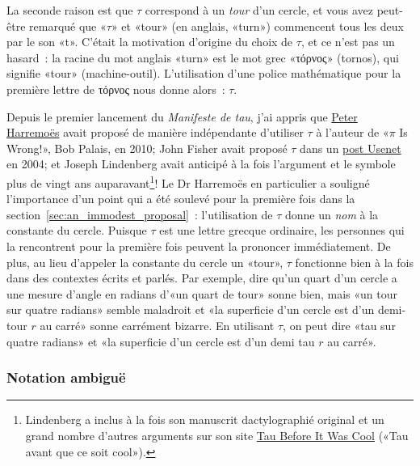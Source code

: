 La seconde raison est que $\tau$ correspond à un \emph{tour} d'un cercle, et
vous avez peut-être remarqué que «\ns $\tau$\ns » et «\ns tour\ns » (en anglais,
«\ns turn\ns ») commencent tous les deux par le son «\ns t\ns ». C'était la
motivation d'origine du choix de $\tau$, et ce n'est pas un hasard~: la racine
du mot anglais «\ns turn\ns » est le mot grec «\ns τόρνος\ns » (tornos), qui signifie
«\ns tour\ns » (machine-outil). L'utilisation d'une
police mathématique pour la première lettre de τόρνος nous donne alors~: $\tau$.

Depuis le premier lancement du \emph{Manifeste de tau}, j'ai appris que
\href{http://www.harremoes.dk/Peter/Undervis/Turnpage/Turnpage1.pdf}{Peter
Harremoës} avait proposé de manière indépendante d'utiliser $\tau$ à l'auteur de
«\ns $\pi$ Is Wrong!\ns », Bob Palais, en 2010\ns; John Fisher avait proposé $\tau$ dans
un
\href{https://groups.google.com/forum/#!msg/sci.math/c-DHmJHSA0A/sLCoOtHB1UAJ}{post
Usenet} en 2004\ns; et Joseph Lindenberg avait anticipé à la fois l'argument et le
symbole plus de vingt ans auparavant\ns\footnote{Lindenberg a inclus à la fois
son manuscrit dactylographié original et un grand nombre d'autres arguments sur
son site \href{https://sites.google.com/site/taubeforeitwascool/}{Tau Before It
Was Cool} («\ns Tau avant que ce soit cool\ns »).}\ns! Le Dr Harremoës en
particulier a souligné l'importance d'un point qui a été soulevé pour la
première fois dans la section~\ref{sec:an_immodest_proposal}~: l'utilisation de
$\tau$ donne un \emph{nom} à la constante du cercle. Puisque $\tau$ est une
lettre grecque ordinaire, les personnes qui la rencontrent pour la première fois
peuvent la prononcer immédiatement. De plus, au lieu d'appeler la
constante du cercle un «\ns tour\ns », $\tau$ fonctionne bien à la fois dans des
contextes écrits et parlés. Par exemple, dire qu'un quart d'un cercle a une
mesure d'angle en radians d'«\ns un quart de tour\ns » sonne bien, mais «\ns un tour sur quatre
radians\ns » semble maladroit et «\ns la superficie d'un cercle est d'un demi-tour $r$
au carré\ns » sonne carrément bizarre. En utilisant $\tau$, on peut dire «\ns tau
sur quatre radians\ns » et «\ns la superficie d'un cercle est d'un demi tau $r$ au
carré\ns ».

    \subsubsection{Notation ambiguë} %
    \label{sec:ambiguous_notation}



